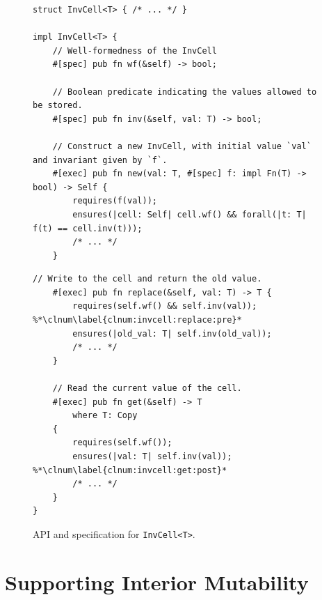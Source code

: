 

\begin{figure}
\noindent\begin{minipage}{.48\textwidth}
\begin{lstlisting}[language=Verus,style=VerusLineNos]
struct InvCell<T> { /* ... */ }

impl InvCell<T> {
    // Well-formedness of the InvCell
    #[spec] pub fn wf(&self) -> bool;

    // Boolean predicate indicating the values allowed to be stored.
    #[spec] pub fn inv(&self, val: T) -> bool;

    // Construct a new InvCell, with initial value `val` and invariant given by `f`.
    #[exec] pub fn new(val: T, #[spec] f: impl Fn(T) -> bool) -> Self {
        requires(f(val));
        ensures(|cell: Self| cell.wf() && forall(|t: T| f(t) == cell.inv(t)));
        /* ... */
    }
\end{lstlisting}
\end{minipage}
\hfill\begin{minipage}{.48\textwidth}
\begin{lstlisting}[language=Verus,style=VerusLineNos,firstnumber=17]
    // Write to the cell and return the old value.
    #[exec] pub fn replace(&self, val: T) -> T {
        requires(self.wf() && self.inv(val)); %*\clnum\label{clnum:invcell:replace:pre}*
        ensures(|old_val: T| self.inv(old_val));
        /* ... */
    }

    // Read the current value of the cell.
    #[exec] pub fn get(&self) -> T
        where T: Copy
    {
        requires(self.wf());
        ensures(|val: T| self.inv(val));  %*\clnum\label{clnum:invcell:get:post}*
        /* ... */
    }
}
\end{lstlisting}
\end{minipage}
    \caption{
        \label{fig:inv-cell-api}
        API and specification for \texttt{InvCell<T>}.
    }
\end{figure}

\section{Supporting Interior Mutability} \label{sec:interior-mutability}

